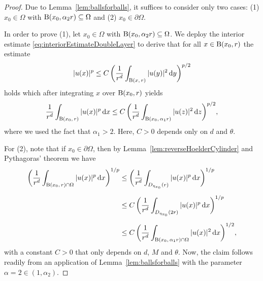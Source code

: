 \begin{proof}

  Due to Lemma~\ref{lem:ballsforballs}, it suffices to consider only two cases: (1) $x_0 \in \Omega$ with $\mathrm{B}(x_0,\alpha_2 r) \subseteq \Omega$ and (2) $x_0 \in \partial\Omega$.

  In order to prove (1), let $x_0 \in \Omega$ with $\mathrm{B}(x_0,\alpha_2 r) \subseteq \Omega$. We deploy the interior estimate \eqref{eq:interiorEstimateDoubleLayer} to derive that for all $x \in \mathrm{B}(x_0,r)$ the estimate
  \begin{align*}
    |u(x)|^p \leq C\, \bigg( \frac{1}{r^{d}} \int_{\mathrm{B}(x,\,r)} |u(y)|^2 \, {\operatorname{d}\!{y}} \bigg)^{p/2}
  \end{align*}
  holds which after integrating $x$ over $\mathrm{B}(x_0, r)$ yields
  \begin{align*}
    \frac{1}{r^{d}}\int_{\mathrm{B}(x_0,\, r)} |u(x)|^p \, {\operatorname{d}\!{x}} \leq C\, \bigg(  \frac{1}{r^{d}}\int_{\mathrm{B}(x_0,\, \alpha_1 r)} |u(z)|^2 \, {\operatorname{d}\!{z}} \bigg)^{p/2},
  \end{align*}
  where we used the fact that $\alpha_1 > 2$. 
  Here, $C > 0$ depends only on $d$ and $\theta$.

  For (2), note that if $x_0 \in \partial\Omega$, then by Lemma~\ref{lem:reverseHoelderCylinder} and Pythagoras' theorem we have
  \begin{align*}
    \bigg( \frac{1}{r^d} \int_{\mathrm{B}(x_0,\, r) \cap \Omega} |u(x)|^p \, {\operatorname{d}\!{x}} \bigg)^{1/p}
    &\leq \bigg( \frac{1}{r^d} \int_{D_{\eta_{x_0}}(r)} |u(x)|^p \, {\operatorname{d}\!{x}} \bigg)^{1/p} \\[0.5em]
    &\leq C \, \bigg( \frac{1}{r^d} \int_{D_{\eta_{x_0}}(2 r)} |u(x)|^p \, {\operatorname{d}\!{x}} \bigg)^{1/p} \\[0.5em]
    &\leq C \, \bigg( \frac{1}{r^d} \int_{\mathrm{B}(x_0,\, \alpha_1 r) \cap \Omega} |u(x)|^2 \, {\operatorname{d}\!{x}} \bigg)^{1/2},
  \end{align*}
  with a constant $C > 0$ that only depends on $d$, $M$ and $\theta$.
  Now, the claim follows readily from an application of Lemma~\ref{lem:ballsforballs} with the parameter $\alpha = 2 \in (1, \alpha_2)$.
\end{proof}

